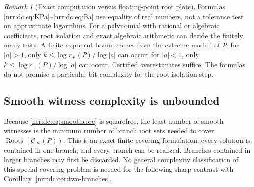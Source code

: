 \documentclass[11pt,letterpaper]{article}
\theoremstyle{definition}
\theoremstyle{remark}
\newtheorem{remark}[theorem]{Remark}
\newcommand{\smoothcore}{\mathcal C_{\infty}}
\newcommand{\roots}{\operatorname{Roots}}
\begin{document}
\begin{remark}[Exact computation versus floating-point root plots]
Formulas \eqref{nrr:dc:eq:KPa}--\eqref{nrr:dc:eq:Ba} use equality of real
numbers, not a tolerance test on approximate logarithms. For a polynomial with
rational or algebraic coefficients, root isolation and exact algebraic
arithmetic can decide the finitely many tests. A finite exponent bound
comes from the extreme moduli of $P$: for $|a|>1$, only
$k\le\log r_+(P)/\log|a|$ can occur; for $|a|<1$, only
$k\le\log r_-(P)/\log|a|$ can occur. Certified overestimates suffice.
The formulas do not promise a particular bit-complexity for the root
isolation step.
\end{remark}

\subsection{Smooth witness complexity is unbounded}

Because \eqref{nrr:dc:eq:smoothcore} is squarefree, the least number of
smooth witnesses is the minimum number of branch root sets needed to cover
$\roots(\smoothcore(P))$. This is an exact finite covering formulation:
every solution is contained in one branch, and every branch can be
realized. Branches contained in larger branches may first be discarded.
No general complexity classification of this special covering problem
is needed for the following sharp contrast with
Corollary~\ref{nrr:dc:cor:two-branches}.
\end{document}
